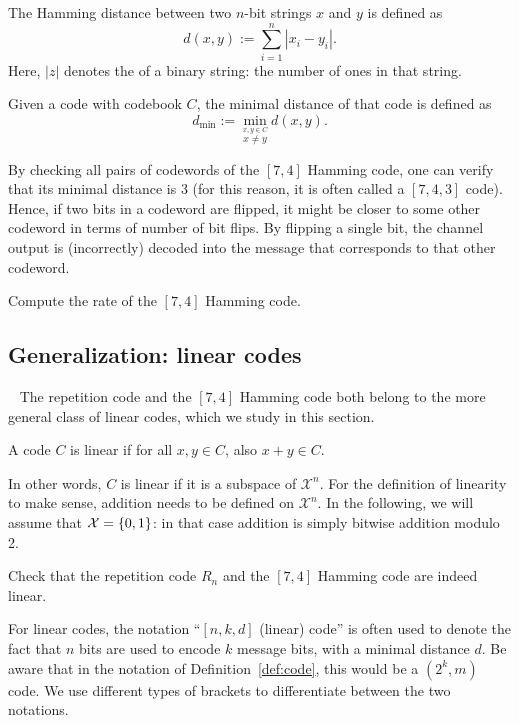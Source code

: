 \begin{definition}
The Hamming distance between two $n$-bit strings $x$ and $y$ is defined as
\[
d(x,y) := \sum_{i=1}^n |x_i - y_i|.
\]
Here, $|z|$ denotes the  of a binary string: the number of ones in that string.
\end{definition}

\begin{definition}
Given a code with codebook $C$, the minimal distance of that code is defined as
\[
d_{\min} := \min_{\stackrel{x,y \in C}{x \neq y}} d(x,y).
\]
\end{definition}
By checking all pairs of codewords of the $[7,4]$ Hamming code, one can verify that its minimal distance is 3 (for this reason, it is often called a $[7,4,3]$ code). Hence, if two bits in a codeword are flipped, it might be closer to some other codeword in terms of number of bit flips. By flipping a single bit, the channel output is (incorrectly) decoded into the message that corresponds to that other codeword.

\begin{exercise}
Compute the rate of the $[7,4]$ Hamming code.
\end{exercise}




\subsection{Generalization: linear codes}~\label{sec:linear-codes}
The repetition code and the $[7,4]$ Hamming code both belong to the more general class of linear codes, which we study in this section.

\begin{definition}
A code $C$ is linear if for all $x, y \in C$, also $x + y \in C$.
\end{definition}
In other words, $C$ is linear if it is a subspace of $\mathcal{X}^n$. For the definition of linearity to make sense, addition needs to be defined on $\mathcal{X}^n$.  In the following, we will assume that $\mathcal{X} = \{0,1\}$: in that case addition is simply bitwise addition modulo 2.
\begin{exercise}
Check that the repetition code $R_n$ and the $[7,4]$ Hamming code are indeed linear.
\end{exercise}

For linear codes, the notation ``$[n,k,d]$ (linear) code'' is often used to denote the fact that $n$ bits are used to encode $k$ message bits, with a minimal distance $d$. Be aware that in the notation of Definition~\ref{def:code}, this would be a $(2^k, m)$ code. We use different types of brackets to differentiate between the two notations.

